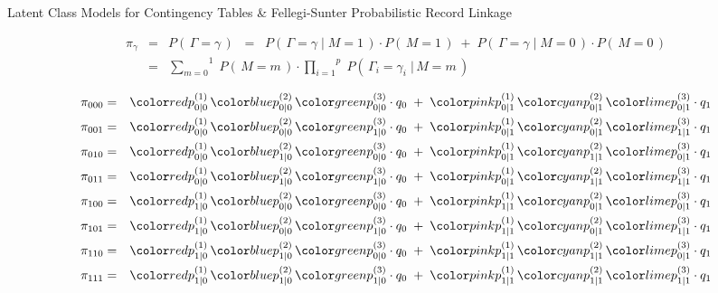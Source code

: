 \begin{frame}{\Large \vskip -0.3cm Latent Class Models for Contingency Tables \&\vskip 0.1cm Fellegi-Sunter Probabilistic Record Linkage}

\tiny

\pause
\vskip -0.25cm
\begin{eqnarray*}
\pi_{\gamma}
& = & P\!\left(\,\Gamma = \gamma\,\right)
\;\; = \;\;
	P\!\left(\,\Gamma = \gamma\;\vert\;M=1\,\right)\cdot P\!\left(\,M=1\,\right)
	\; + \;
	P\!\left(\,\Gamma = \gamma\;\vert\;M=0\,\right)\cdot P\!\left(\,M=0\,\right)
\\
& = &
	\overset{1}{\underset{m=0}{\sum}}\;
	P\!\left(\,M=m\,\right) \cdot
	\overset{p}{\underset{i=1}{\prod}}\;P\!\left(\,\Gamma_{i} = \gamma_{i}\;\vert\,M=m\,\right)
\end{eqnarray*}

\pause
\scriptsize
\begin{eqnarray*}
\pi_{000} &=& \pozz\,\ptzz\,\phzz \cdot q_{0} \;+\; \pozo\,\ptzo\,\phzo \cdot q_{1} \\
\pi_{001} &=& \pozz\,\ptzz\,\phoz \cdot q_{0} \;+\; \pozo\,\ptzo\,\phoo \cdot q_{1} \\
\pi_{010} &=& \pozz\,\ptoz\,\phzz \cdot q_{0} \;+\; \pozo\,\ptoo\,\phzo \cdot q_{1} \\
\pi_{011} &=& \pozz\,\ptoz\,\phoz \cdot q_{0} \;+\; \pozo\,\ptoo\,\phoo \cdot q_{1} \\
\pi_{100} &=& \pooz\,\ptzz\,\phzz \cdot q_{0} \;+\; \pooo\,\ptzo\,\phzo \cdot q_{1} \\
\pi_{101} &=& \pooz\,\ptzz\,\phoz \cdot q_{0} \;+\; \pooo\,\ptzo\,\phoo \cdot q_{1} \\
\pi_{110} &=& \pooz\,\ptoz\,\phzz \cdot q_{0} \;+\; \pooo\,\ptoo\,\phzo \cdot q_{1} \\
\pi_{111} &=& \pooz\,\ptoz\,\phoz \cdot q_{0} \;+\; \pooo\,\ptoo\,\phoo \cdot q_{1} \\
\end{eqnarray*}


\end{frame}
\normalsize

